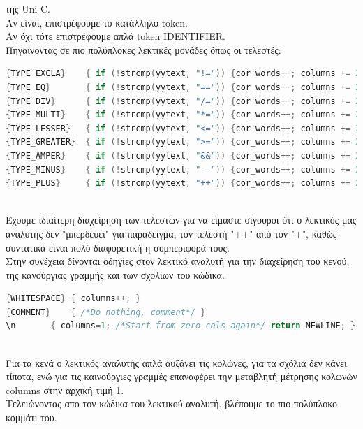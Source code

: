 \documentclass[14pt]{extarticle}
\begin{document}
της Uni-C.
\\
Αν είναι, επιστρέφουμε το κατάλληλο token.
\\
Αν όχι τότε επιστρέφουμε απλά token IDENTIFIER.
\clearpage
\\
Πηγαίνοντας σε πιο πολύπλοκες λεκτικές μονάδες όπως οι τελεστές:
\\
\begin{lstlisting}[language=C]
{TYPE_EXCLA}    { if (!strcmp(yytext, "!=")) {cor_words++; columns += 2; return NEQ;        } else    { columns++; return EXCLA;  }}
{TYPE_EQ}       { if (!strcmp(yytext, "==")) {cor_words++; columns += 2; return EQQ;        } else    { columns++; return EQ;     }}
{TYPE_DIV}      { if (!strcmp(yytext, "/=")) {cor_words++; columns += 2; return EQ_DIV;     } else    { columns++; return DIV;    }}
{TYPE_MULTI}    { if (!strcmp(yytext, "*=")) {cor_words++; columns += 2; return EQ_MULTI;   } else    { columns++; return MULTI;  }}
{TYPE_LESSER}   { if (!strcmp(yytext, "<=")) {cor_words++; columns += 2; return LESSER_EQ;  } else    { columns++; return LESSER; }}
{TYPE_GREATER}  { if (!strcmp(yytext, ">=")) {cor_words++; columns += 2; return GREATER_EQ; } else    { columns++; return GREATER;}}
{TYPE_AMPER}    { if (!strcmp(yytext, "&&")) {cor_words++; columns += 2; return LOGICAL_AND;} else    { columns++; return AMPER;  }}
{TYPE_MINUS}    { if (!strcmp(yytext, "--")) {cor_words++; columns += 2; return MINUSMINUS; } else if (!strcmp(yytext, "-=")) { columns+=2; return EQ_MINUS; } else { columns++; return MINUS;}}
{TYPE_PLUS}     { if (!strcmp(yytext, "++")) {cor_words++; columns += 2; return PLUSPLUS;   } else if (!strcmp(yytext, "+=")) { columns+=2; return EQ_PLUS;  } else { columns++; return PLUS; }}
\end{lstlisting}
\\
Έχουμε ιδιαίτερη διαχείρηση των τελεστών για να είμαστε σίγουροι ότι ο λεκτικός
μας αναλυτής δεν "μπερδεύει" για παράδειγμα, τον τελεστή "++" από τον "+", καθώς
συντατικά είναι πολύ διαφορετική η συμπεριφορά τους.
\\
Στην συνέχεια δίνονται οδηγίες στον λεκτικό αναλυτή για την διαχείρηση του κενού,
της κανούργιας γραμμής και των σχολίων του κώδικα.
\begin{lstlisting}[language=C]
{WHITESPACE} { columns++; }
{COMMENT}    { /*Do nothing, comment*/ }
\n       { columns=1; /*Start from zero cols again*/ return NEWLINE; }
\end{lstlisting}
\\
Για τα κενά ο λεκτικός αναλυτής απλά αυξάνει τις κολώνες, για τα σχόλια δεν κάνει
τίποτα, ενώ για τις καινούργιες γραμμές επαναφέρει την μεταβλητή μέτρησης κολωνών
columns στην αρχική τιμή 1.
\\
Τελειώνοντας απο τον κώδικα του λεκτικού αναλυτή, βλέπουμε το πιο πολύπλοκο κομμάτι του.
\clearpage
\end{document}

